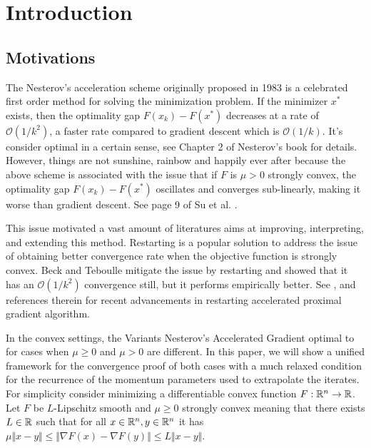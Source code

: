 \documentclass[12pt]{article}
\begin{document}
\section{Introduction}
    \subsection{Motivations}
        The Nesterov's acceleration scheme originally proposed in 1983 \cite{nesterov_method_1983} is a celebrated first order method for solving the minimization problem.
        If the minimizer $x^*$ exists, then the optimality gap $F(x_k) - F(x^*)$ decreases at a rate of $\mathcal O(1/k^2)$, a faster rate compared to gradient descent which is $\mathcal O(1/k)$.
        It's consider optimal in a certain sense, see Chapter 2 of Nesterov's book \cite{nesterov_lectures_2018} for details.
        However, things are not sunshine, rainbow and happily ever after because the above scheme is associated with the issue that if $F$ is $\mu > 0$ strongly convex, the optimality gap $F(x_k) - F(x^*)$ oscillates and converges sub-linearly, making it worse than gradient descent. See page 9 of Su et al. \cite{su_differential_2016}.
        \par
        This issue motivated a vast amount of literatures aims at improving, interpreting, and extending this method.
        Restarting is a popular solution to address the issue of obtaining better convergence rate when the objective function is strongly convex.
        Beck and Teboulle \cite{beck_fast_2009} mitigate the issue by restarting and showed that it has an $\mathcal O(1/k^2)$ convergence still, but it performs empirically better.
        See \cite{aujol_parameter-free_2024}, \cite{necoara_linear_2019} and references therein for recent advancements in restarting accelerated proximal gradient algorithm.
        \par
        In the convex settings, the Variants Nesterov's Accelerated Gradient optimal to for cases when $\mu \ge 0$ and $\mu > 0$ are different.
        In this paper, we will show a unified framework for the convergence proof of both cases with a much relaxed condition for the recurrence of the momentum parameters used to extrapolate the iterates.
        For simplicity consider minimizing a differentiable convex function $F: \mathbb R^n \rightarrow \mathbb R$.
        Let $F$ be $L$-Lipschitz smooth and $\mu \ge 0$ strongly convex meaning that there exists $L \in \mathbb R$ such that for all $x \in \mathbb R^n, y\in \mathbb R^n$ it has $\mu\Vert x - y\Vert\le \Vert \nabla F(x) - \nabla F(y)\Vert \le L \Vert x - y \Vert$.
\end{document}
